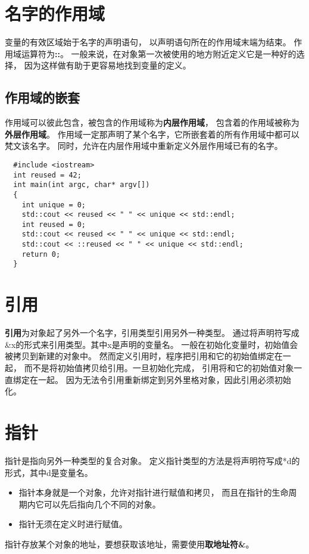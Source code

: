 \section{名字的作用域}
变量的有效区域始于名字的声明语句，%
以声明语句所在的作用域末端为结束。%
作用域运算符为{\bfseries{::}}。
一般来说，在对象第一次被使用的地方附近定义它是一种好的选择，%
因为这样做有助于更容易地找到变量的定义。
\subsection{作用域的嵌套}
作用域可以彼此包含，被包含的作用域称为{\bfseries{内层作用域}}，%
包含着的作用域被称为{\bfseries{外层作用域}}。%
作用域一定那声明了某个名字，它所嵌套着的所有作用域中都可以梵文该名字。%
同时，允许在内层作用域中重新定义外层作用域已有的名字。
\begin{lstlisting}
  #include <iostream>
  int reused = 42;
  int main(int argc, char* argv[])
  {
    int unique = 0;
    std::cout << reused << " " << unique << std::endl;
    int reused = 0;
    std::cout << reused << " " << unique << std::endl;
    std::cout << ::reused << " " << unique << std::endl;
    return 0;
  }
\end{lstlisting}

\section{引用}
{\bfseries{引用}}为对象起了另外一个名字，引用类型引用另外一种类型。%
通过将声明符写成\&x的形式来引用类型。其中x是声明的变量名。
一般在初始化变量时，初始值会被拷贝到新建的对象中。%
然而定义引用时，程序把引用和它的初始值绑定在一起，%
而不是将初始值拷贝给引用。一旦初始化完成，%
引用将和它的初始值对象一直绑定在一起。%
因为无法令引用重新绑定到另外里格对象，{\color{red}因此引用必须初始化}。

\section{指针}
指针是指向另外一种类型的复合对象。%
定义指针类型的方法是将声明符写成*d的形式，其中d是变量名。
\begin{itemize}
\item{指针本身就是一个对象，允许对指针进行赋值和拷贝，%
    而且在指针的生命周期内它可以先后指向几个不同的对象。%
  }
\item{指针无须在定义时进行赋值。}
\end{itemize}
指针存放某个对象的地址，要想获取该地址，需要使用{\bfseries{取地址符\&}}。
